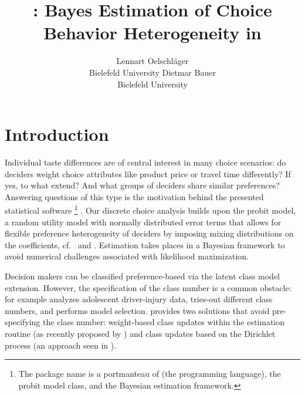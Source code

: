 \documentclass[article]{jss}
\author{Lennart Oelschl\"ager \\Bielefeld University \And Dietmar Bauer\\Bielefeld University}
\title{\pkg{RprobitB}: Bayes Estimation of Choice Behavior Heterogeneity in \proglang{R}}
\newcommand{\fct}[1]{\code{#1()}}
\begin{document}



\section{Introduction}
\label{sec:introduction}

Individual taste differences are of central interest in many choice scenarios: do deciders weight choice attributes like product price or travel time differently? If yes, to what extend? And what groups of deciders share similar preferences? Answering questions of this type is the motivation behind the presented statistical software \footnote{The package name is a portmanteau of  (the programming language), the probit model class, and the Bayesian estimation framework.} \citep{Oelschlaeger:2021}. Our discrete choice analysis builds upon the probit model, a random utility model with normally distributed error terms that allows for flexible preference heterogeneity of deciders by imposing mixing distributions on the coefficients, cf.\ \cite{Train:2009} and \cite{Bhat:2011}. Estimation takes places in a Bayesian framework to avoid numerical challenges associated with likelihood maximization.

Decision makers can be classified preference-based via the latent class model extension. However, the specification of the class number is a common obstacle: \cite{Xiong:2013} for example analyzes adolescent driver-injury data, tries-out different class numbers, and performs model selection.  provides two solutions that avoid pre-specifying the class number: weight-based class updates within the estimation routine (as recently proposed by \cite{Oelschlaeger:2020}) and class updates based on the Dirichlet process (an approach seen in \cite{Burda:2008}).
\end{document}
